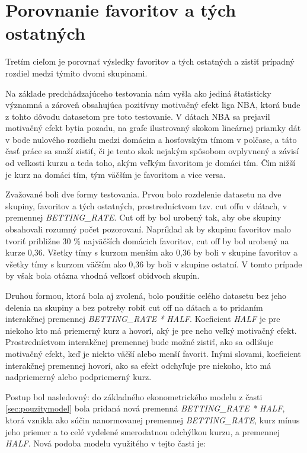 \documentclass[
  digital, %
  oneside, %
  notable,   %
  lof,     %
  lot,     %
]{fithesis3}
\begin{document}
	\section{Porovnanie favoritov a tých ostatných}
	Tretím cieľom je porovnať výsledky favoritov a tých ostatných a zistiť prípadný rozdiel medzi týmito dvomi skupinami.

	Na základe predchádzajúceho testovania nám vyšla ako jediná štatisticky významná a zároveň obsahujúca pozitívny motivačný efekt liga NBA, ktorá bude z tohto dôvodu datasetom pre toto testovanie. V dátach NBA sa prejavil motivačný efekt bytia pozadu, na grafe ilustrovaný skokom lineárnej priamky dát v bode nulového rozdielu medzi domácim a hosťovským tímom v polčase, a táto časť práce sa snaží zistiť, či je tento skok nejakým spôsobom ovplyvnený a závisí od veľkosti kurzu a teda toho, akým veľkým favoritom je domáci tím. Čím nižší je kurz na domáci tím, tým väčším je favoritom a vice versa. 

	Zvažované boli dve formy testovania. Prvou bolo rozdelenie datasetu na dve skupiny, favoritov a tých ostatných, prostredníctvom tzv. cut offu v dátach, v premennej \textit{BETTING\_RATE}. Cut off by bol urobený tak, aby obe skupiny obsahovali rozumný počet pozorovaní. Napríklad ak by skupinu favoritov malo tvoriť približne 30 \% najväčších domácich favoritov, cut off by bol urobený na kurze 0,36. Všetky tímy s kurzom menším ako 0,36 by boli v skupine favoritov a všetky tímy s kurzom väčším ako 0,36 by boli v skupine ostatní. V tomto prípade by však bola otázna vhodná veľkosť obidvoch skupín.

	Druhou formou, ktorá bola aj zvolená, bolo použitie celého datasetu bez jeho delenia na skupiny a bez potreby robiť cut off na dátach a to pridaním interakčnej premennej \textit{BETTING\_RATE * HALF}. Koeficient \textit{HALF} je pre niekoho kto má priemerný kurz a hovorí, aký je pre neho veľký motivačný efekt. Prostredníctvom interakčnej premennej bude možné zistiť, ako sa odlišuje motivačný efekt, keď je niekto väčší alebo menší favorit. Inými slovami, koeficient interakčnej premennej hovorí, ako sa efekt odchyľuje pre niekoho, kto má nadpriemerný alebo podpriemerný kurz. 
	
	Postup bol nasledovný: do základného ekonometrického modelu z časti \ref{sec:pouzitymodel} bola pridaná nová premenná \textit{BETTING\_RATE * HALF}, ktorá vznikla ako súčin nanormovanej premennej \textit{BETTING\_RATE}, kurz mínus jeho priemer a to celé vydelené smerodatnou odchýlkou kurzu, a premennej \textit{HALF}. Nová podoba modelu využitého v tejto časti je:
	
\end{document}
